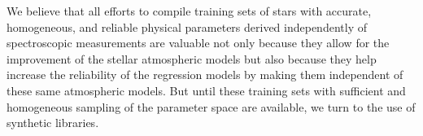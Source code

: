 We believe that all efforts to compile training sets of stars with
accurate, homogeneous, and reliable physical parameters derived
independently of spectroscopic measurements are valuable not only
because they allow for the improvement of the stellar atmospheric
models but also because they help increase the reliability of the
regression models by making them independent of these same atmospheric
models. But until these training sets with sufficient and homogeneous
sampling of the parameter space are available, we turn to the use of
synthetic libraries. 

